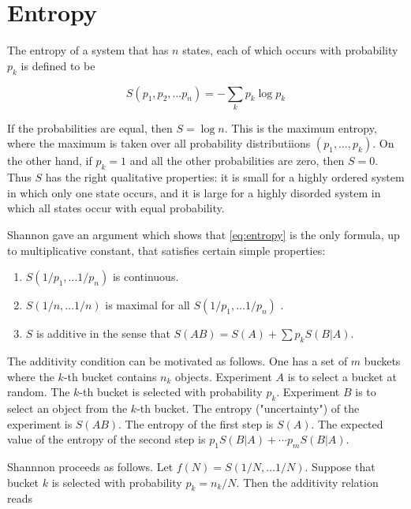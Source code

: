 


\section{Entropy}

The entropy of a system that has $n$ states, each of which occurs with probability $p_k$ is defined to be

\begin{equation}
\label{eq:entropy}
S(p_1, p_2, \ldots p_n) = - \sum_k p_k \log p_k
\end{equation}

If the probabilities are equal, then $S = \log n$.  This is the maximum entropy, where the maximum is taken over all probability distributiions $(p_1, \ldots , p_k)$.  On the other hand, if $p_k  = 1$ and all the other probabilities are zero, then $S = 0$.  Thus $S$ has the right qualitative properties: it is small for a highly ordered system in which only one state occurs, and it is large for a highly disorded system in which all states occur with equal probability.

Shannon gave an argument which shows that \eqref{eq:entropy} is the
only formula, up to multiplicative constant, that satisfies certain simple properties:

\begin{enumerate}


\item $S(1/p_1, \ldots 1/p_n)$  is continuous.

\item $S(1/n, \ldots 1/n) $ is maximal for all $S(1/p_1, \ldots 1/p_n)$ .

\item $S$ is additive in the sense that 
$S(AB) = S(A) + \sum p_kS(B|A)$.

\end{enumerate}

The additivity condition can be motivated as follows. One has a set of $m$ buckets where the $k$-th bucket contains $n_k$ objects.  Experiment $A$ is to select a bucket at random.  The $k$-th bucket is selected with probability $p_k$.  Experiment $B$ is to select an object from the $k$-th bucket. The entropy ("uncertainty") of the experiment is $S(AB)$.  The entropy of the first step is $S(A)$.  The expected value of the entropy of the second step is $p_1S(B|A) + \cdots p_mS(B|A)$.

Shannnon proceeds as follows.  Let $f(N) = S(1/N, \ldots 1/N)$.  Suppose that bucket $k$ is selected with probability $p_k = n_k/N$.  Then the additivity relation reads

